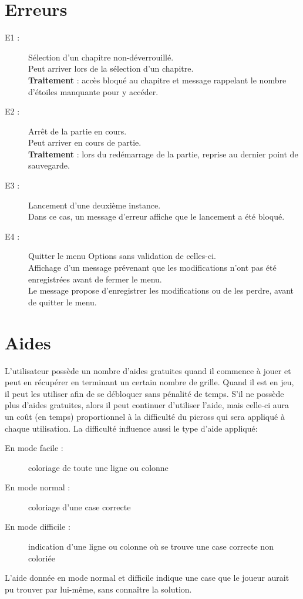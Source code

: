 \documentclass{report}
\begin{document}
	\section{Erreurs}
	\begin{description}
	\item[E1 :] Sélection d'un chapitre non-déverrouillé.\\
			Peut arriver lors de la sélection d'un chapitre.\\
			\textbf{Traitement} : accès bloqué au chapitre et message rappelant le nombre d'étoiles manquante pour y accéder.

		\item[E2 :] Arrêt de la partie en cours.\\
			Peut arriver en cours de partie.\\
			\textbf{Traitement} : lors du redémarrage de la partie, reprise au dernier point de sauvegarde.
		
        \item[E3 :] Lancement d'une deuxième instance.\\
			Dans ce cas, un message d'erreur affiche que le lancement a été bloqué.

        \item[E4 :] Quitter le menu Options sans validation de celles-ci.\\
			Affichage d'un message prévenant que les modifications n'ont pas été enregistrées avant de fermer le menu.\\ 
			Le message propose d'enregistrer les modifications ou de les perdre, avant de quitter le menu.
		\end{description}

			
  \section{Aides}

  L'utilisateur possède un nombre d'aides gratuites quand il commence à jouer et peut en récupérer en terminant un certain nombre de grille. Quand il est en jeu, il peut les utiliser afin de se débloquer sans pénalité de temps. S'il ne possède plus d'aides gratuites, alors il peut continuer d'utiliser l'aide, mais celle-ci aura un coût (en temps) proportionnel à la difficulté du picross qui sera appliqué à chaque utilisation. La difficulté influence aussi le type d'aide appliqué:
    \begin{description}
    \item[En mode facile :] coloriage de toute une ligne ou colonne
    \item[En mode normal :] coloriage d'une case correcte 
    \item[En mode difficile :] indication d'une ligne ou colonne où se trouve une case correcte non coloriée
    \end{description}
  L'aide donnée en mode normal et difficile indique une case que le joueur aurait pu trouver par lui-même, sans connaître la solution. 
			
\end{document}
